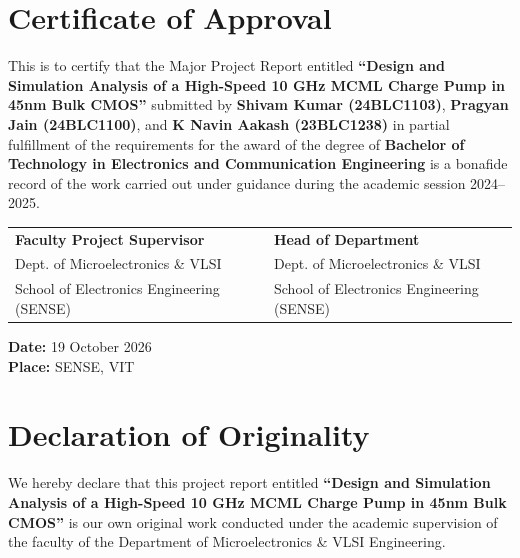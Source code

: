 \documentclass[11pt,a4paper]{report}
\begin{document}
\setcounter{page}{2}

\chapter*{Certificate of Approval}

This is to certify that the Major Project Report entitled \textbf{``Design and Simulation Analysis of a High-Speed 10 GHz MCML Charge Pump in 45nm Bulk CMOS''} submitted by \textbf{Shivam Kumar (24BLC1103)}, \textbf{Pragyan Jain (24BLC1100)}, and \textbf{K Navin Aakash (23BLC1238)} in partial fulfillment of the requirements for the award of the degree of \textbf{Bachelor of Technology in Electronics and Communication Engineering} is a bonafide record of the work carried out under guidance during the academic session 2024--2025.

\vspace{2.5cm}
\noindent
\begin{tabularx}{\textwidth}{XrX}
\textbf{Faculty Project Supervisor} & & \textbf{Head of Department} \\
Dept. of Microelectronics \& VLSI & & Dept. of Microelectronics \& VLSI \\
School of Electronics Engineering (SENSE) & & School of Electronics Engineering (SENSE)
\end{tabularx}

\vspace{2.5cm}
\noindent
\textbf{Date:} 19 October 2026 \\
\textbf{Place:} SENSE, VIT

\newpage

\chapter*{Declaration of Originality}

We hereby declare that this project report entitled \textbf{``Design and Simulation Analysis of a High-Speed 10 GHz MCML Charge Pump in 45nm Bulk CMOS''} is our own original work conducted under the academic supervision of the faculty of the Department of Microelectronics \& VLSI Engineering. 
\end{document}
